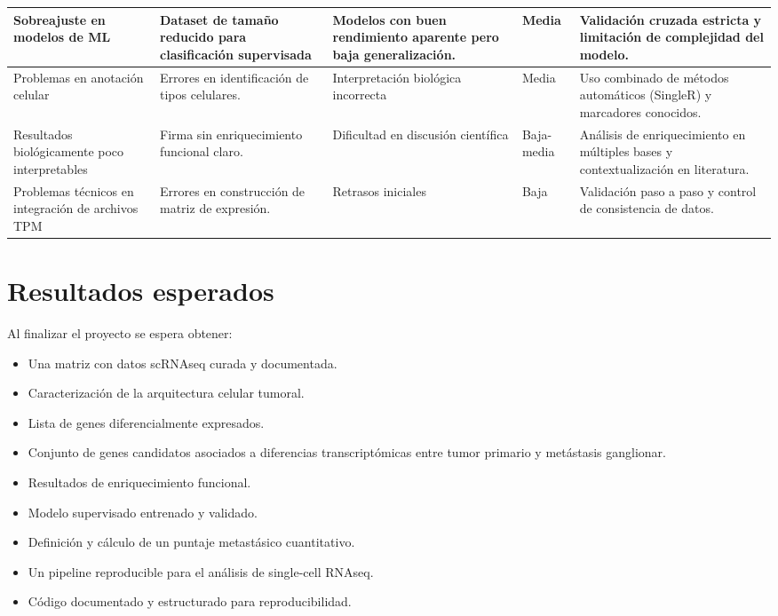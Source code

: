 \documentclass[11pt]{article}
\begin{document}
\begin{table}[h!]
{\begin{tabular}{|p{}|p{}|p{}|p{}|p{}|}
				\hline
				Sobreajuste en modelos de ML & Dataset de tamaño reducido para clasificación supervisada & Modelos con buen rendimiento aparente pero baja generalización. & Media & Validación cruzada estricta y limitación de complejidad del modelo. \\
				\hline
				Problemas en anotación celular & Errores en identificación de tipos celulares. & Interpretación biológica incorrecta & Media & Uso combinado de métodos automáticos (SingleR) y marcadores conocidos. \\
				\hline
				Resultados biológicamente poco interpretables & Firma sin enriquecimiento funcional claro. & Dificultad en discusión científica & Baja-media & Análisis de enriquecimiento en múltiples bases y contextualización en literatura. \\
				\hline
				Problemas técnicos en integración de archivos TPM & Errores en construcción de matriz de expresión. & Retrasos iniciales & Baja & Validación paso a paso y control de consistencia de datos. \\
				\hline
			\end{tabular}
		}
		\end{table}

	
	\section{Resultados esperados}
	
	Al finalizar el proyecto se espera obtener:
	
	\begin{itemize}
		
		\item Una matriz con datos scRNAseq curada y documentada.
		
		\item Caracterización de la arquitectura celular tumoral.
		
		\item Lista de genes diferencialmente expresados.
		

		\item Conjunto de genes candidatos asociados a diferencias transcriptómicas entre tumor primario y metástasis ganglionar.
		
		\item Resultados de enriquecimiento funcional.
		
		\item Modelo supervisado entrenado y validado.
		
		\item Definición y cálculo de un puntaje metastásico cuantitativo.
		
		\item Un pipeline reproducible para el análisis de single-cell RNAseq.
		
		\item Código documentado y estructurado para reproducibilidad.
		
	\end{itemize}
\end{document}
